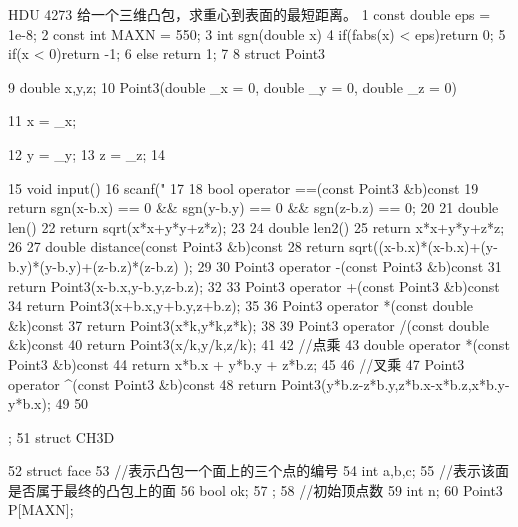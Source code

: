 \documentclass[11pt]{article}
\begin{document}
\begin{Code}
     HDU 4273 给一个三维凸包，求重心到表面的最短距离。
 1   const double eps = 1e-8;
 2   const int MAXN = 550;
 3   int sgn(double x){
 4       if(fabs(x) < eps)return 0;
 5       if(x < 0)return -1;
 6       else return 1;
 7   }
 8   struct Point3{
 9       double x,y,z;
10       Point3(double _x = 0, double _y = 0, double _z = 0){
11           x = _x;


12              y = _y;
13              z = _z;
14       }
15       void input(){
16           scanf("%
17       }
18       bool operator ==(const Point3 &b)const{
19           return sgn(x-b.x) == 0 && sgn(y-b.y) == 0 && sgn(z-b.z) ==
                0;
20       }
21       double len(){
22           return sqrt(x*x+y*y+z*z);
23       }
24       double len2(){
25           return x*x+y*y+z*z;
26       }
27       double distance(const Point3 &b)const{
28           return sqrt((x-b.x)*(x-b.x)+(y-b.y)*(y-b.y)+(z-b.z)*(z-b.z)
                );
29       }
30       Point3 operator -(const Point3 &b)const{
31           return Point3(x-b.x,y-b.y,z-b.z);
32       }
33       Point3 operator +(const Point3 &b)const{
34           return Point3(x+b.x,y+b.y,z+b.z);
35       }
36       Point3 operator *(const double &k)const{
37           return Point3(x*k,y*k,z*k);
38       }
39       Point3 operator /(const double &k)const{
40           return Point3(x/k,y/k,z/k);
41       }
42       //点乘
43       double operator *(const Point3 &b)const{
44           return x*b.x + y*b.y + z*b.z;
45       }
46       //叉乘
47       Point3 operator ^(const Point3 &b)const{
48           return Point3(y*b.z-z*b.y,z*b.x-x*b.z,x*b.y-y*b.x);
49       }
50 };
51 struct CH3D{
52     struct face{
53         //表示凸包一个面上的三个点的编号
54         int a,b,c;
55         //表示该面是否属于最终的凸包上的面
56         bool ok;
57     };
58     //初始顶点数
59     int n;
60     Point3 P[MAXN];


}
\end{Code}
\end{document}
